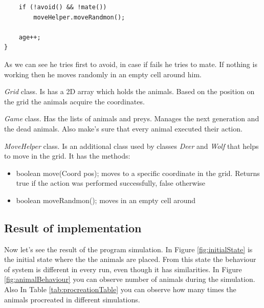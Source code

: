 \documentclass[11pt]{article}
\begin{document}
\begin{description}
\begin{lstlisting}
	if (!avoid() && !mate())
		moveHelper.moveRandmon();
	
	age++;
}
\end{lstlisting}
As we can see he tries first to avoid, in case if fails he tries to mate. If nothing is working then he moves randomly in an empty cell around him.

\item
\emph{Grid} class. Is has a 2D array which holds the animals. Based on the position on the grid the animals acquire the coordinates.

\item
\emph{Game} class. Has the lists of animals and preys. Manages the next generation and the dead animals. Also make's sure that every animal executed their action.
\item
\emph{MoveHelper} class. Is an additional class used by classes \emph{Deer} and \emph{Wolf} that helps to move in the grid. It has the methods:
	\begin{itemize}
	\item
	{\ttfamily boolean move(Coord pos);} moves to a specific coordinate in the grid. Returns true if the action was performed successfully, false otherwise
	\item
	{\ttfamily boolean moveRandmon();} moves in an empty cell around
	\end{itemize}

\end{description}

\newpage
\subsection*{Result of implementation}
Now let's see the result of the program simulation. In Figure \ref{fig:initialState} is the initial state where the the animals are placed. From this state the behaviour of system is different in every run, even though it has similarities. In Figure \ref{fig:animalBehaviour} you can observe number of animals during the simulation. Also In Table \ref{tab:procreationTable} you can observe how many times the animals procreated in different simulations.
\end{document}
